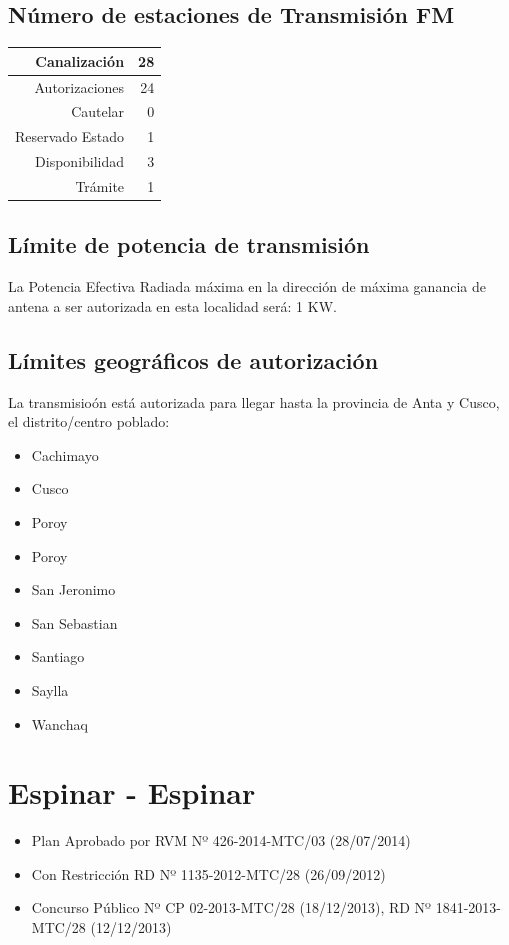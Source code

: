 \documentclass[11pt]{article}
\begin{document}
\subsection{Número de estaciones de Transmisión FM}

\begin{tabular}{|r|r|} \hline
	Canalización 			& 28 \\ \hline
	Autorizaciones			& 24 \\ \hline
	Cautelar				& 0 \\ \hline
	Reservado Estado		& 1 \\ \hline
	Disponibilidad			& 3 \\ \hline
	Trámite					& 1 \\ \hline 
\end{tabular}

\subsection{Límite de potencia de transmisión}

La Potencia Efectiva Radiada máxima en la dirección de máxima ganancia de antena a ser autorizada en esta localidad será: 1 KW.

\subsection{Límites geográficos de autorización}

La transmisioón está autorizada para llegar hasta la provincia de Anta y Cusco, el distrito/centro poblado:

\begin{itemize}
	\item Cachimayo
	\item Cusco
	\item Poroy
	\item Poroy
	\item San Jeronimo
	\item San Sebastian
	\item Santiago
	\item Saylla
	\item Wanchaq
\end{itemize}



\section{Espinar - Espinar}

\begin{itemize}
	\item Plan Aprobado por RVM Nº 426-2014-MTC/03 (28/07/2014)
	\item Con Restricción RD Nº 1135-2012-MTC/28 (26/09/2012)
	\item Concurso Público Nº CP 02-2013-MTC/28 (18/12/2013), RD Nº 1841-2013-MTC/28 (12/12/2013)
\end{itemize}
\end{document}
